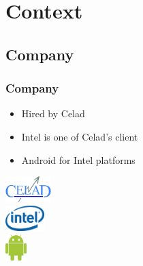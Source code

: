 %
%

\section{Context}

\subsection{Company}
\begin{frame}
    \frametitle{Company}
    \begin{minipage}{0.49\textwidth}
        \begin{itemize}
            \item Hired by Celad
            \item Intel is one of Celad's client
            \item Android for Intel platforms
        \end{itemize}
    \end{minipage}
    \begin{minipage}{0.49\textwidth}
        \flushright
        \includegraphics[height=1cm]{../../report/src/img/logocelad.jpg} \\[0.5cm]
        \includegraphics[height=1cm]{../../report/src/img/logointel.jpg} \\[0.5cm]
        \includegraphics[height=1cm]{./img/androidLogo.png}
    \end{minipage}
\end{frame}

